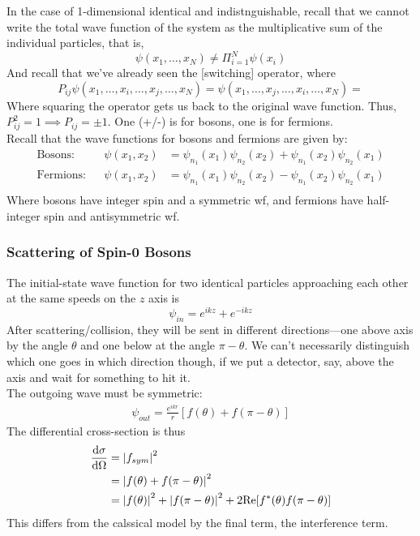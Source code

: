 \documentclass[a4paper]{article}
\begin{document}
In the case of 1-dimensional identical and indistnguishable, recall that we
cannot write the total wave function of the system as the multiplicative sum of
the individual particles, that is,
\[
	\psi(x_1,\ldots,x_N) \neq \Pi_{i=1}^{N} \psi(x_i)
\]
And recall that we've already seen the [switching] operator, where
\[
	P_{ij}\psi(x_1,\ldots,x_i,\ldots,x_j,\ldots,x_N) =
	\psi(x_1,\ldots,x_j,\ldots,x_i,\ldots,x_N) =
\]
Where squaring the operator gets us back to the original wave function.
Thus, $P^2_{ij} = 1 \implies P_{ij} = \pm 1$. One (+/-) is for bosons, one is
for fermions.\\
Recall that the wave functions for bosons and fermions are given by:
\begin{align*}
	\text{Bosons:}&&
	\psi(x_1,x_2) &= \psi_{n_1}(x_1)\psi_{n_2}(x_2)+
	\psi_{n_1}(x_2)\psi_{n_2}(x_1)\\
	\text{Fermions:}&&
	\psi(x_1,x_2) &= \psi_{n_1}(x_1)\psi_{n_2}(x_2)-
	\psi_{n_1}(x_2)\psi_{n_2}(x_1)\\
\end{align*}
Where bosons have integer spin and a symmetric wf, and fermions have
half-integer spin and antisymmetric wf.

\subsubsection{Scattering of Spin-0 Bosons}
The initial-state wave function for two identical particles approaching each
other at the same speeds on the $z$ axis is
\[
	\psi_{in} = e^{ikz} + e^{-ikz}
\]
After scattering/collision, they will be sent in different directions---one
above axis by the angle $\theta$ and one below at the angle $\pi-\theta$. We
can't necessarily distinguish which one goes in which direction though, if we
put a detector, say, above the axis and wait for something to hit it.\\
The outgoing wave must be symmetric:
\begin{align*}
	\psi_{out} = \frac{e^{ikr}}{r}[f(\theta) + f(\pi-\theta)]
\end{align*}
The differential cross-section is thus
\begin{align*}
	\frac{\mathrm{d} \sigma}{\mathrm{d} \Omega} &= \left\lvert f_{sym}\right\rvert^2\\
	&= \left\lvert f(\theta)+f(\pi-\theta)\right\rvert^2\\
	&= \left\lvert f(\theta)\right\rvert^2 + \left\lvert f(\pi-\theta)\right\rvert^2
	+ 2\mathrm{Re}[f^\ast(\theta)f(\pi-\theta)]
\end{align*}
This differs from the calssical model by the final term, the interference term.
\end{document}
